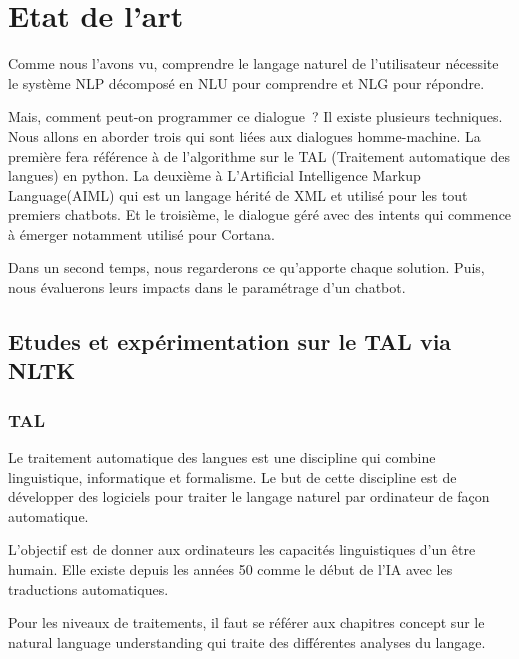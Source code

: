 \graphicspath{{etatArtImages/}}
\chapter{Etat de l'art}


Comme nous l’avons vu, comprendre le langage naturel de l’utilisateur nécessite le système NLP décomposé en NLU pour comprendre et NLG pour répondre.
\vspace{1em}

 Mais, comment peut-on programmer ce dialogue ?
	Il existe plusieurs techniques. Nous allons en aborder trois qui sont liées aux dialogues homme-machine. La première fera référence à de l’algorithme sur le TAL (Traitement automatique des langues) en python. La deuxième à L’Artificial Intelligence Markup Language(AIML) qui est un langage hérité de XML et utilisé pour les tout premiers chatbots. Et le troisième, le dialogue géré avec des intents qui commence à émerger notamment utilisé pour Cortana.
\vspace{1em}
	
	Dans un second temps, nous regarderons ce qu’apporte chaque solution. Puis, nous évaluerons leurs impacts dans le paramétrage d’un chatbot.


\section{Etudes et expérimentation sur le TAL via NLTK}


\subsection{TAL}


Le traitement automatique des langues est une discipline qui combine linguistique, informatique et formalisme.  Le but de cette discipline est de développer des logiciels pour traiter le langage naturel par ordinateur de façon automatique.
\vspace{1em}

	L’objectif est de donner aux ordinateurs les capacités linguistiques d’un être humain. Elle existe depuis les années 50 comme le début de l’IA avec les traductions automatiques.
	\vspace{1em}
	
	Pour les niveaux de traitements, il faut se référer aux chapitres concept sur le natural language understanding qui traite des différentes analyses du langage.
	\vspace{1em}
	
